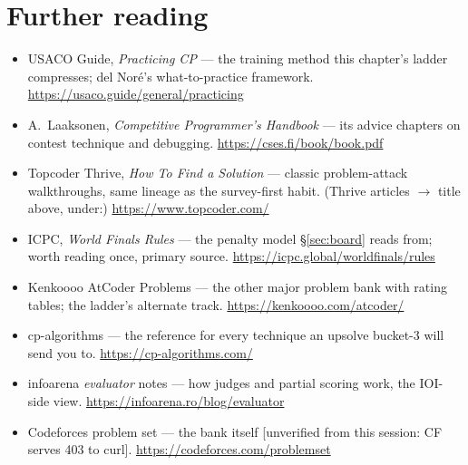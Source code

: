 \section*{Further reading}
\begin{itemize}
\item USACO Guide, \emph{Practicing CP} --- the training
method this chapter's ladder compresses; del Nor\'e's
what-to-practice framework.
\newline\url{https://usaco.guide/general/practicing}
\item A.~Laaksonen, \emph{Competitive Programmer's Handbook}
--- its advice chapters on contest technique and debugging.
\newline\url{https://cses.fi/book/book.pdf}
\item Topcoder Thrive, \emph{How To Find a Solution} ---
classic problem-attack walkthroughs, same lineage as the
survey-first habit. (Thrive articles $\to$ title above, under:)
\newline\url{https://www.topcoder.com/}
\item ICPC, \emph{World Finals Rules} --- the penalty model
\S\ref{sec:board} reads from; worth reading once, primary
source.
\newline\url{https://icpc.global/worldfinals/rules}
\item Kenkoooo AtCoder Problems --- the other major problem
bank with rating tables; the ladder's alternate track.
\newline\url{https://kenkoooo.com/atcoder/}
\item cp-algorithms --- the reference for every technique an
upsolve bucket-3 will send you to.
\newline\url{https://cp-algorithms.com/}
\item infoarena \emph{evaluator} notes --- how judges and
partial scoring work, the IOI-side view.
\newline\url{https://infoarena.ro/blog/evaluator}
\item Codeforces problem set --- the bank itself
[unverified from this session: CF serves 403 to curl].
\newline\url{https://codeforces.com/problemset}
\end{itemize}

